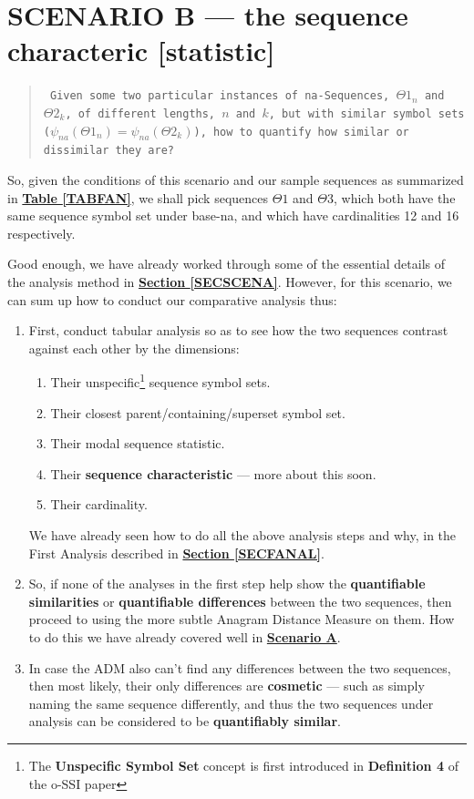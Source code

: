 \documentclass[a4paper, 18pt]{book} %
\begin{document}
\section{SCENARIO B --- the sequence characteric [statistic]}
\label{SECSCENB}

\begin{quote}
\small
\texttt{
Given some two particular instances of na-Sequences, $\Theta1_n$ and $\Theta2_k$, of different lengths, $n$ and $k$, but with similar symbol sets ($\psi_{na}(\Theta1_n) = \psi_{na}(\Theta2_k)$), how to quantify how similar or dissimilar they are?}
\end{quote}

So, given the conditions of this scenario and our sample sequences as summarized in \textbf{\hyperref[TABFAN]{Table \ref{TABFAN}}}, we shall pick sequences $\Theta1$ and $\Theta3$, which both have the same sequence symbol set under base-na, and which have cardinalities 12 and 16 respectively.

Good enough, we have already worked through some of the essential details of the analysis method in \textbf{\hyperref[SECSCENA]{Section \ref{SECSCENA}}}. However, for this scenario, we can sum up how to conduct our comparative analysis thus:

\begin{enumerate}
\item{First, conduct tabular analysis so as to see how the two sequences contrast against each other by the dimensions: 
\begin{enumerate}
\item Their unspecific\footnote{The \textbf{Unspecific Symbol Set} concept is first introduced in \textbf{Definition 4} of the o-SSI paper\cite{ossipaper}} sequence symbol sets.
\item Their closest parent/containing/superset symbol set.
\item Their modal sequence statistic.
\item Their \textbf{sequence characteristic} --- more about this soon.
\item Their cardinality.
\end{enumerate}

We have already seen how to do all the above analysis steps and why, in the First Analysis described in \textbf{\hyperref[SECFANAL]{Section \ref{SECFANAL}}}.
}
\item So, if none of the analyses in the first step help show the \textbf{quantifiable similarities} or \textbf{quantifiable differences} between the two sequences, then proceed to using the more subtle Anagram Distance Measure on them. How to do this we have already covered well in \textbf{\hyperref[SECSCENA]{Scenario A}}.
\item In case the ADM also can't find any differences between the two sequences, then most likely, their only differences are \textbf{cosmetic} --- such as simply naming the same sequence differently, and thus the two sequences under analysis can be considered to be \textbf{quantifiably similar}.
\end{enumerate}
\end{document}
